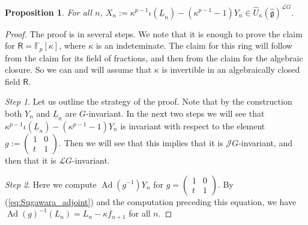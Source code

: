 \documentclass{amsart}
\newtheorem{Prop}[Thm]{Proposition}
\theoremstyle{definition}
\newcommand{\Ring}{\mathsf{R}}
\newcommand{\hg}{\hat{\mathfrak{g}}}
\newcommand{\F}{\mathbb{F}}
\newcommand{\Jet}{\mathscr{J}}
\newcommand{\Loop}{\mathscr{L}}
\numberwithin{equation}{section}
\begin{document}
\begin{Prop}\label{Prop:HC_center_sl2_noninteger}
For all $n$,  $X_n:=\kappa^{p-1}\iota(\underline{L}_n)-(\kappa^{p-1}-1)Y_n\in\widehat{U}_\kappa(\hg)^{\Loop G}$.
\end{Prop}
\begin{proof}
The proof is in several steps. We note that it is enough to prove the claim for $\Ring=\F_p[\kappa]$, where $\kappa$ is an indeteminate. The claim for this ring will follow from the claim for its field of fractions, and then from the claim for the algebraic closure. So we can and will assume that $\kappa$ is invertible in an algebraically closed field $\Ring$. 

{\it Step 1}. Let us outline the strategy of the proof. 
Note that by the construction both $Y_n$ and $\underline{L}_n$
are $G$-invariant. In the next two steps we will see that
$\kappa^{p-1}\iota(\underline{L}_n)-(\kappa^{p-1}-1)Y_n$ is invariant with respect to the element  $g:=\begin{pmatrix}1&0\\t&1\end{pmatrix}$. Then we will see that this implies that it is $\Jet G$-invariant, and then that it is $\Loop G$-invariant. 

{\it Step 2}. Here we compute $\operatorname{Ad}(g^{-1})Y_n$ for 
$g=\begin{pmatrix}1&0\\t&1\end{pmatrix}$. By (\ref{eq:Sugawara_adjoint}) and the computation preceding this equation, we have $\operatorname{Ad}(g)^{-1}(L_n)=L_n-\kappa f_{n+1}$ for all $n$. 


\end{proof}
\end{document}
